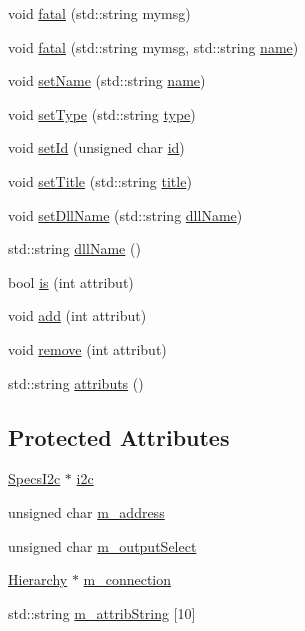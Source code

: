 \begin{DoxyCompactItemize}
\item 
void \hyperlink{classObject_aad5a16aac7516ce65bd5ec02ab07fc80}{fatal} (std\+::string mymsg)
\item 
void \hyperlink{classObject_ae62acd3d09f716220f75f252dc38bc9a}{fatal} (std\+::string mymsg, std\+::string \hyperlink{classObject_a300f4c05dd468c7bb8b3c968868443c1}{name})
\item 
void \hyperlink{classObject_ae30fea75683c2d149b6b6d17c09ecd0c}{set\+Name} (std\+::string \hyperlink{classObject_a300f4c05dd468c7bb8b3c968868443c1}{name})
\item 
void \hyperlink{classObject_aae534cc9d982bcb9b99fd505f2e103a5}{set\+Type} (std\+::string \hyperlink{classObject_a84f99f70f144a83e1582d1d0f84e4e62}{type})
\item 
void \hyperlink{classObject_a398fe08cba594a0ce6891d59fe4f159f}{set\+Id} (unsigned char \hyperlink{classObject_af99145335cc61ff6e2798ea17db009d2}{id})
\item 
void \hyperlink{classObject_a89557dbbad5bcaa02652f5d7fa35d20f}{set\+Title} (std\+::string \hyperlink{classObject_a73a0f1a41828fdd8303dd662446fb6c3}{title})
\item 
void \hyperlink{classObject_a870c5af919958c2136623b2d7816d123}{set\+Dll\+Name} (std\+::string \hyperlink{classObject_a2e3947f2870094c332d7454117f3ec63}{dll\+Name})
\item 
std\+::string \hyperlink{classObject_a2e3947f2870094c332d7454117f3ec63}{dll\+Name} ()
\item 
bool \hyperlink{classAttrib_a704f26af560909ad22065083bb7d4c34}{is} (int attribut)
\item 
void \hyperlink{classAttrib_a235f773af19c900264a190b00a3b4ad7}{add} (int attribut)
\item 
void \hyperlink{classAttrib_a7d4ef7e32d93cb287792b87b857e79f3}{remove} (int attribut)
\item 
std\+::string \hyperlink{classAttrib_aee7bbf16b144887f196e1341b24f8a26}{attributs} ()
\end{DoxyCompactItemize}
\subsection*{Protected Attributes}
\begin{DoxyCompactItemize}
\item 
\hyperlink{classSpecsI2c}{Specs\+I2c} $\ast$ \hyperlink{classSpecsSlave_a5210e5a45c381ee29a830b42119ec1d3}{i2c}
\item 
unsigned char \hyperlink{classSpecsInterface_a4064da5ca6e0a172363967c4acc0b365}{m\+\_\+address}
\item 
unsigned char \hyperlink{classSpecsInterface_a660cb4112ce1c071f277cb6ec115b411}{m\+\_\+output\+Select}
\item 
\hyperlink{classHierarchy}{Hierarchy} $\ast$ \hyperlink{classElement_abe3de7a5dbbc9a6dd2d7e012e5fdb266}{m\+\_\+connection}
\item 
std\+::string \hyperlink{classAttrib_a3414521d7a82476e874b25a5407b5e63}{m\+\_\+attrib\+String} \mbox{[}10\mbox{]}
\end{DoxyCompactItemize}

